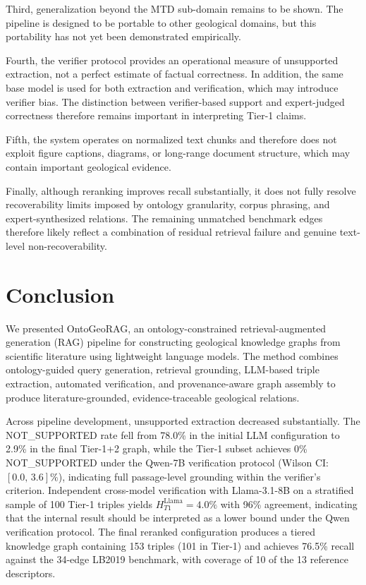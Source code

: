 \documentclass[10pt]{article}
\newcommand{\method}{OntoGeoRAG}
\newcommand{\WI}[2]{\ensuremath{[#1{,}\,#2]\%}}
\begin{document}
Third, generalization beyond the MTD sub-domain remains to be shown.
The pipeline is designed to be portable to other geological domains,
but this portability has not yet been demonstrated empirically.

Fourth, the verifier protocol provides an operational measure of
unsupported extraction, not a perfect estimate of factual correctness.
In addition, the same base model is used for both extraction and
verification, which may introduce verifier bias.
The distinction between verifier-based support and expert-judged
correctness therefore remains important in interpreting Tier-1 claims.

Fifth, the system operates on normalized text chunks and therefore
does not exploit figure captions, diagrams, or long-range document
structure, which may contain important geological evidence.

Finally, although reranking improves recall substantially, it does not
fully resolve recoverability limits imposed by ontology granularity,
corpus phrasing, and expert-synthesized relations.
The remaining unmatched benchmark edges therefore likely reflect a
combination of residual retrieval failure and genuine text-level
non-recoverability.
\section{Conclusion}
\label{sec:conclusion}

We presented \method{}, an ontology-constrained retrieval-augmented
generation (RAG) pipeline for constructing geological knowledge
graphs from scientific literature using lightweight language models.
The method combines ontology-guided query generation, retrieval
grounding, LLM-based triple extraction, automated verification, and
provenance-aware graph assembly to produce literature-grounded,
evidence-traceable geological relations.

Across pipeline development, unsupported extraction decreased
substantially.
The NOT\_SUPPORTED rate fell from 78.0\% in the initial LLM
configuration to 2.9\% in the final Tier-1+2 graph, while the Tier-1 subset achieves 0\% NOT\_SUPPORTED under the
Qwen-7B verification protocol (Wilson CI: \WI{0.0}{3.6}), indicating full passage-level grounding within the verifier's criterion.
Independent cross-model verification with
Llama-3.1-8B on a stratified sample of 100 Tier-1 triples
yields $H_{T1}^{\text{Llama}} = 4.0\%$ with 96\% agreement,
indicating that the internal result should be interpreted
as a lower bound under the Qwen verification protocol.
The final reranked configuration produces a tiered knowledge graph
containing 153 triples (101 in Tier-1) and achieves 76.5\% recall
against the 34-edge LB2019 benchmark, with coverage of 10 of the
13 reference descriptors.
\end{document}
